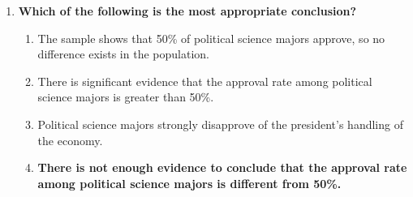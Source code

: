 \documentclass[12pt]{article}
\begin{document}
\begin{enumerate}
\item \textbf{Which of the following is the most appropriate conclusion?}
    \begin{enumerate}
        \item The sample shows that 50\% of political science majors approve, so no difference exists in the population.
        \item There is significant evidence that the approval rate among political science majors is greater than 50\%.
        \item Political science majors strongly disapprove of the president's handling of the economy.
        \item \textbf{There is not enough evidence to conclude that the approval rate among political science majors is different from 50\%.}
    \end{enumerate}

\end{enumerate}
\end{document}

